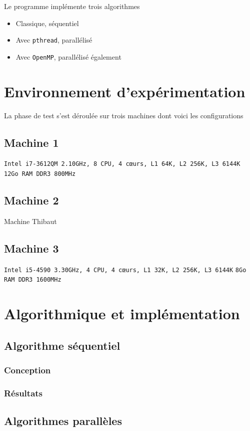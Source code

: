 \documentclass[12pt]{article}
\begin{document}
Le programme implémente trois algorithmes
\begin{itemize}
	\item Classique, séquentiel
	\item Avec \texttt{pthread}\cite{pthreads}, parallélisé
	\item Avec \texttt{OpenMP}, parallélisé également
\end{itemize}

\section{Environnement d'expérimentation}
La phase de test s'est déroulée sur trois machines dont voici les configurations

\subsection{Machine 1}
\texttt{Intel i7-3612QM 2.10GHz, 8 CPU, 4 cœurs, L1 64K, L2 256K, L3 6144K}
\texttt{12Go RAM DDR3 800MHz}

\subsection{Machine 2}
Machine Thibaut

\subsection{Machine 3}
\texttt{Intel i5-4590 3.30GHz, 4 CPU, 4 cœurs, L1 32K, L2 256K, L3 6144K}
\texttt{8Go RAM DDR3 1600MHz}

\section{Algorithmique et implémentation}
	\subsection{Algorithme séquentiel}
		\subsubsection{Conception}
		\subsubsection{Résultats}

	\subsection{Algorithmes parallèles}
\end{document}

